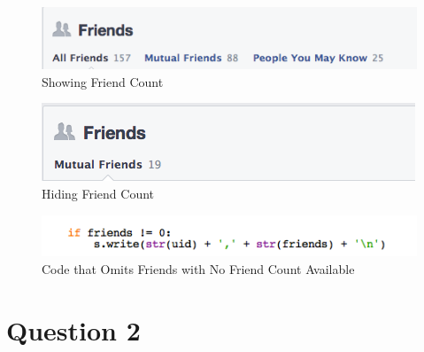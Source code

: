 \documentclass{article}
\begin{document}
\begin{figure}[H]
\centering
\includegraphics[scale=0.75]{q1/showfriendsprofile}
\caption{Showing Friend Count}
\label{showfriendsprofile}
\end{figure}

\begin{figure}[H]
\centering
\includegraphics[scale=0.75]{q1/hidefriendsprofile}
\caption{Hiding Friend Count}
\label{hidefriendsprofile}
\end{figure}

\begin{figure}[H]
\centering
\includegraphics[scale=0.75]{q1/nofriendcount}
\caption{Code that Omits Friends with No Friend Count Available}
\label{nofriendcount}
\end{figure}





\newpage

\section*{Question 2}
\end{document}
